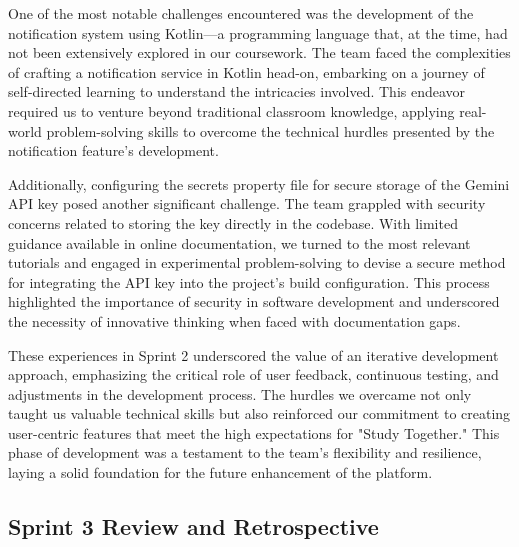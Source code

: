 One of the most notable challenges encountered was the development of the notification system using Kotlin—a programming language that, at the time, had not been extensively explored in our coursework. The team faced the complexities of crafting a notification service in Kotlin head-on, embarking on a journey of self-directed learning to understand the intricacies involved. This endeavor required us to venture beyond traditional classroom knowledge, applying real-world problem-solving skills to overcome the technical hurdles presented by the notification feature's development.

Additionally, configuring the secrets property file for secure storage of the Gemini API key posed another significant challenge. The team grappled with security concerns related to storing the key directly in the codebase. With limited guidance available in online documentation, we turned to the most relevant tutorials and engaged in experimental problem-solving to devise a secure method for integrating the API key into the project's build configuration. This process highlighted the importance of security in software development and underscored the necessity of innovative thinking when faced with documentation gaps.

These experiences in Sprint 2 underscored the value of an iterative development approach, emphasizing the critical role of user feedback, continuous testing, and adjustments in the development process. The hurdles we overcame not only taught us valuable technical skills but also reinforced our commitment to creating user-centric features that meet the high expectations for "Study Together." This phase of development was a testament to the team's flexibility and resilience, laying a solid foundation for the future enhancement of the platform.

\subsection{Sprint 3 Review and Retrospective}\label{sprint3_review_retrospective}

